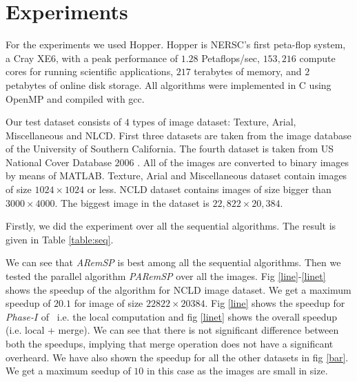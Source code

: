\section{Experiments}
\label{sec:experiments}



For the experiments we used Hopper. Hopper is NERSC's first peta-flop system, a
Cray XE6, with a peak performance of $1.28$ Petaflops/sec, $153,216$ compute
cores for running scientific applications, $217$ terabytes of memory, and $2$
petabytes of online disk storage. All algorithms were implemented in C using OpenMP and compiled with gcc.

Our test dataset consists of $4$ types of image dataset: Texture, Arial,
Miscellaneous and NLCD. First three datasets are taken from the image database of the University of 
Southern California\cite{}. The fourth dataset is taken from US National Cover Database
$2006$ \cite{}. All of the images are converted to binary images by means of MATLAB.
Texture, Arial and Miscellaneous dataset contain images of size $1024 \times
1024$ or less.
NCLD dataset contains images of size bigger than $3000 \times
4000$. The biggest image in the dataset is $22,822 \times 20,384$.

Firstly, we did the experiment over all the sequential algorithms. The result is given in Table \ref{table:seq}. 

We can see that {\em ARemSP} is best among all
the sequential algorithms. Then we tested the parallel algorithm {\em PARemSP} over all the images. 
Fig \ref{line}-\ref{linet} shows the speedup of the algorithm for 
NCLD image dataset. We get a maximum speedup of $20.1$ for image of size $22822 \times 20384$. 
Fig \ref{line} shows the speedup for {\em Phase-$I$} of \paremsp\ i.e. 
the local computation and fig \ref{linet} shows the overall speedup (i.e. local + merge). We can see that there is not 
significant difference between both the speedups, implying that merge operation does not have a significant overheard.
We have also shown the speedup for all the other datasets in fig \ref{bar}.
We get a maximum seedup of $10$ in this case as the images are small in size.  


